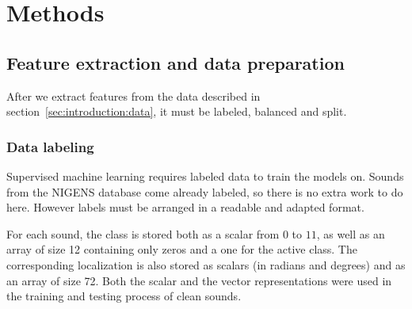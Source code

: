 \chapter{Methods}
\label{sec:methods}


\section{Feature extraction and data preparation}
\label{sec:methods:data}

After we extract features from the data described in section~\ref{sec:introduction:data}, it must be labeled, balanced and split.

\subsection{Data labeling}

Supervised machine learning requires labeled data to train the models on. Sounds from the NIGENS database come already labeled, so there is no extra work to do here. However labels must be arranged in a readable and adapted format.

For each sound, the class is stored both as a scalar from $0$ to $11$, as well as an array of size 12 containing only zeros and a one for the active class. The corresponding localization is also stored as scalars (in radians and degrees) and as an array of size 72. Both the scalar and the vector representations were used in the training and testing process of clean sounds.

